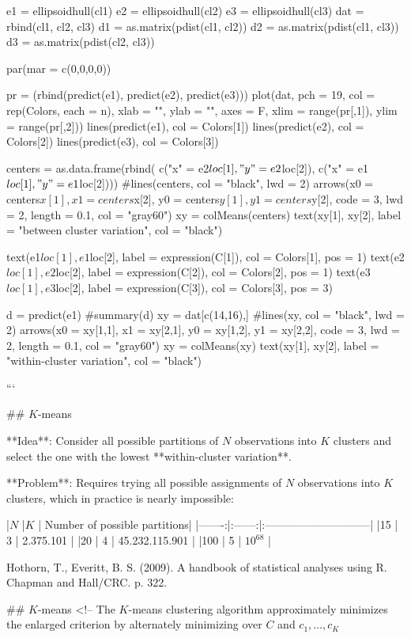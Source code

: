 e1 = ellipsoidhull(cl1)
e2 = ellipsoidhull(cl2)
e3 = ellipsoidhull(cl3)
dat = rbind(cl1, cl2, cl3)
d1 = as.matrix(pdist(cl1, cl2))
d2 = as.matrix(pdist(cl1, cl3))
d3 = as.matrix(pdist(cl2, cl3))

par(mar = c(0,0,0,0))

pr = (rbind(predict(e1), predict(e2), predict(e3)))
plot(dat, pch = 19, col = rep(Colors, each = n),
  xlab = "", ylab = "", axes = F, xlim = range(pr[,1]), ylim = range(pr[,2]))
lines(predict(e1), col = Colors[1])
lines(predict(e2), col = Colors[2])
lines(predict(e3), col = Colors[3])


centers = as.data.frame(rbind(
  c("x" = e2$loc[1], "y" = e2$loc[2]),
  c("x" = e1$loc[1], "y" = e1$loc[2])))
#lines(centers, col = "black", lwd = 2)
arrows(x0 = centers$x[1], x1 = centers$x[2],
  y0 = centers$y[1], y1 = centers$y[2], code = 3, lwd = 2, length = 0.1, col = "gray60")
xy = colMeans(centers)
text(xy[1], xy[2], label = "between cluster variation", col = "black")

text(e1$loc[1], e1$loc[2], label = expression(C[1]), col = Colors[1], pos = 1)
text(e2$loc[1], e2$loc[2], label = expression(C[2]), col = Colors[2], pos = 1)
text(e3$loc[1], e3$loc[2], label = expression(C[3]), col = Colors[3], pos = 3)

d = predict(e1)
#summary(d)
xy = dat[c(14,16),]
#lines(xy, col = "black", lwd = 2)
arrows(x0 = xy[1,1], x1 = xy[2,1],
  y0 = xy[1,2], y1 = xy[2,2], code = 3, lwd = 2, length = 0.1, col = "gray60")
xy = colMeans(xy)
text(xy[1], xy[2], label = "within-cluster variation", col = "black")

```


## $K$-means

**Idea**: Consider all possible partitions of $N$ observations into $K$ clusters and select the one with the lowest **within-cluster variation**.

**Problem**: Requires trying all possible assignments of $N$ observations into $K$ clusters, which in practice is nearly impossible:

|$N$     |$K$     | Number of possible partitions|
|-------:|:------:|:-----------------------------|
|15      | 3      | 2.375.101                    |
|20      | 4      | 45.232.115.901               |
|100     | 5      | $10^{68}$                    |

\tiny
Hothorn, T., Everitt, B. S. (2009). A handbook of statistical analyses using R. Chapman and Hall/CRC. p. 322.

## $K$-means
<!--
The $K$-means clustering algorithm approximately minimizes
the enlarged criterion by alternately minimizing over $C$
and $c_1,\hdots , c_K$

